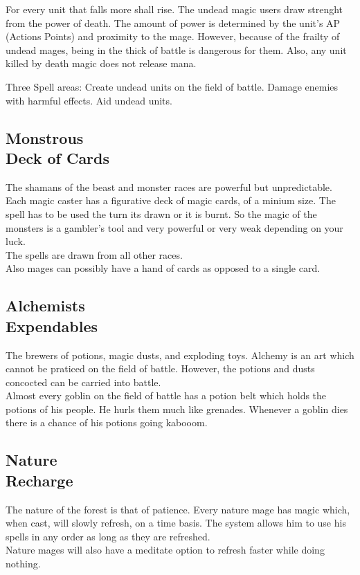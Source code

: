\documentclass[a4paper]{article}
\begin{document}
For every unit that falls more shall rise. The undead magic users draw strenght from the power of death. The amount of power is determined by the unit's AP (Actions Points) and proximity to the mage. However, because of the frailty of undead mages, being in the thick of battle is dangerous for them. Also, any unit killed by death magic does not release mana.

Three Spell areas:
Create undead units on the field of battle.
Damage enemies with harmful effects.
Aid undead units.

\subsection{Monstrous \\Deck of Cards}

The shamans of the beast and monster races are powerful but unpredictable. Each magic caster has a figurative deck of magic cards, of a minium size. The spell has to be used the turn its drawn or it is burnt. So the magic of the monsters is a gambler's tool and very powerful or very weak depending on your luck.\\
The spells are drawn from all other races.\\
Also mages can possibly have a hand of cards as opposed to a single card.

\subsection{Alchemists \\ Expendables}

The brewers of potions, magic dusts, and exploding toys. Alchemy is an art which cannot be praticed on the field of battle. However, the potions and dusts concocted can be carried into battle.\\
Almost every goblin on the field of battle has a potion belt which holds the potions of his people. He hurls them much like grenades. Whenever a goblin dies there is a chance of his potions going kabooom.

\subsection{Nature \\ Recharge}

The nature of the forest is that of patience. Every nature mage has magic which, when cast, will slowly refresh, on a time basis. The system allows him to use his spells in any order as long as they are refreshed.\\
Nature mages will also have a meditate option to refresh faster while doing nothing.
\end{document}
